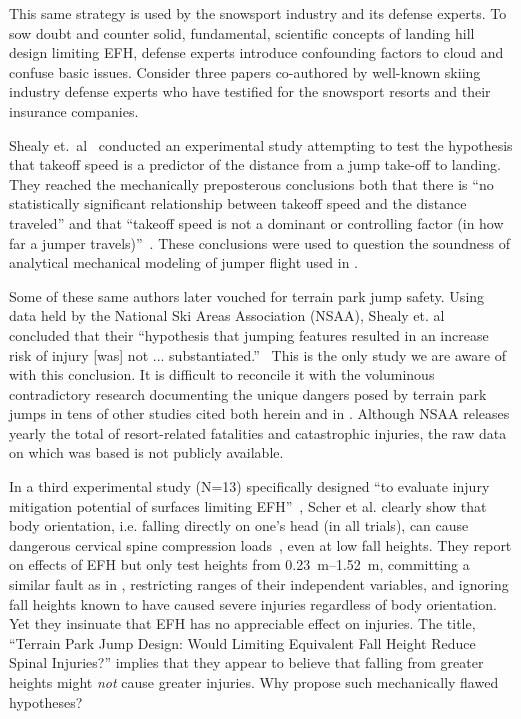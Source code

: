 \documentclass[smallextended]{svjour3}       %
\begin{document}
This same strategy is used by the snowsport industry and its defense experts.
To sow doubt and counter solid, fundamental, scientific concepts of landing
hill design limiting EFH, defense experts introduce confounding factors to
cloud and confuse basic issues.  Consider three papers
\cite{Shealy2010,Shealy2015,Scher2015} co-authored by well-known skiing
industry defense experts who have testified for the snowsport resorts and their
insurance companies.

Shealy et.~al~\cite{Shealy2010} conducted an experimental study attempting to
test the hypothesis that takeoff speed is a predictor of the distance from a
jump take-off to landing. They reached the mechanically preposterous
conclusions both that there is ``no statistically significant relationship
between takeoff speed and the distance traveled'' and that ``takeoff speed is
not a dominant or controlling factor (in how far a jumper
travels)''~\cite{Shealy2010}. These conclusions were used to question the
soundness of analytical mechanical modeling of jumper flight used in
\cite{Hubbard2009,McNeil2012}.

Some of these same authors later vouched for terrain park jump safety. Using
data held by the National Ski Areas Association (NSAA), Shealy et.
al~\cite{Shealy2015} concluded that their ``hypothesis that jumping features
resulted in an increase risk of injury [was] not ...
substantiated.''~\cite{Shealy2015} This is the only study we are aware of with
this conclusion. It is difficult to reconcile it with the voluminous
contradictory research documenting the unique dangers posed by terrain park
jumps in tens of other studies cited both herein and in
\cite{Hubbard2009,Swedberg2012,McNeil2012,McNeil2012a,Hubbard2015,Levy2015,Petrone2017,Moore2018}.
Although NSAA releases yearly the total of resort-related fatalities and
catastrophic injuries, the raw data on which \cite{Shealy2015} was based is not
publicly available.

In a third experimental study (N=13) specifically designed ``to evaluate injury
mitigation potential of surfaces limiting EFH''~\cite{Scher2015}, Scher et al.
clearly show that body orientation, i.e. falling directly on one's head (in all
trials), can cause dangerous cervical spine compression loads~\cite{Scher2015},
even at low fall heights. They report on effects of EFH but only test heights
from \SIrange{0.23}{1.52}{\meter}, committing a similar fault as in
\cite{Shealy2010}, restricting ranges of their independent variables, and
ignoring fall heights known to have caused severe injuries regardless of body
orientation. Yet they insinuate that EFH has no appreciable effect on injuries.
The title, ``Terrain Park Jump Design: Would Limiting Equivalent Fall Height
Reduce Spinal Injuries?'' implies that they appear to believe that falling from
greater heights might \emph{not} cause greater injuries. Why propose such
mechanically flawed hypotheses?
\end{document}
